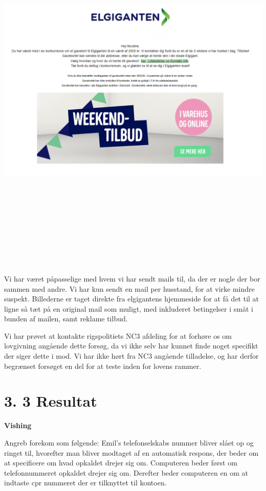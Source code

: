 \documentclass[11pt]{report}
\begin{document}
\begin{center}
\includegraphics[height=18cm, width=17cm]{Phishing-Email}
\end{center}
Vi har været påpasselige med hvem vi har sendt mails til, da der er nogle der bor sammen med andre. Vi har kun sendt en mail per husstand, for at virke mindre suspekt. Billederne er taget direkte fra elgigantens hjemmeside for at få det til at ligne så tæt på en original mail som muligt, med inkluderet betingelser i småt i bunden af mailen, samt reklame tilbud. 

Vi har prøvet at kontakte rigspolitiets NC3 afdeling for at forhøre os om lovgivning angående dette forsøg, da vi ikke selv har kunnet finde noget specifikt der siger dette i mod. Vi har ikke hørt fra NC3 angående tilladelse, og har derfor begrænset forsøget en del for at teste inden for lovens rammer. 

\section*{3. 3 Resultat}
\noindent\textbf{Vishing}
\par Angreb forekom som følgende: Emil’s telefonselskabs nummer bliver slået op og ringet til, hvorefter man bliver modtaget af en automatisk respons, der beder om at specificere om hvad opkaldet drejer sig om. Computeren beder først om telefonnummeret opkaldet drejer sig om. Derefter beder computeren en om at indtaste cpr nummeret der er tilknyttet til kontoen. 
	
\end{document}
